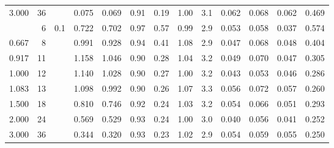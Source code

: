 \begin{table}[htbp]
\begin{tabular}{rrrrrrrrrrrrr}
3.000 & 36 &  & 0.075 & 0.069 & 0.91 & 0.19 & 1.00 & 3.1 & 0.062 & 0.068 & 0.062 & 0.469 \\
\addlinespace
0.500 & 6 & 0.1 & 0.722 & 0.702 & 0.97 & 0.57 & 0.99 & 2.9 & 0.053 & 0.058 & 0.037 & 0.574 \\
0.667 & 8 &  & 0.991 & 0.928 & 0.94 & 0.41 & 1.08 & 2.9 & 0.047 & 0.068 & 0.048 & 0.404 \\
0.917 & 11 &  & 1.158 & 1.046 & 0.90 & 0.28 & 1.04 & 3.2 & 0.049 & 0.070 & 0.047 & 0.305 \\
1.000 & 12 &  & 1.140 & 1.028 & 0.90 & 0.27 & 1.00 & 3.2 & 0.043 & 0.053 & 0.046 & 0.286 \\
1.083 & 13 &  & 1.098 & 0.992 & 0.90 & 0.26 & 1.07 & 3.3 & 0.056 & 0.072 & 0.057 & 0.260 \\
1.500 & 18 &  & 0.810 & 0.746 & 0.92 & 0.24 & 1.03 & 3.2 & 0.054 & 0.066 & 0.051 & 0.293 \\
2.000 & 24 &  & 0.569 & 0.529 & 0.93 & 0.24 & 1.00 & 3.0 & 0.040 & 0.056 & 0.041 & 0.252 \\
3.000 & 36 &  & 0.344 & 0.320 & 0.93 & 0.23 & 1.02 & 2.9 & 0.054 & 0.059 & 0.055 & 0.250 \\
\bottomrule
\end{tabular}
\end{table}
